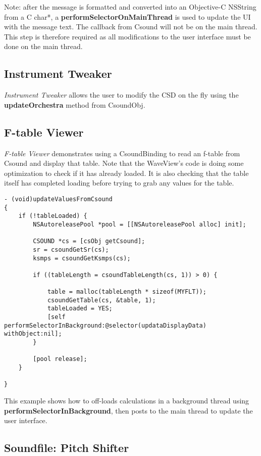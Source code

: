 \documentclass[11pt]{article}
\begin{document}
Note: after the message is formatted and converted into an Objective-C NSString from a C char*, a \textbf{performSelectorOnMainThread} is used to update the UI with the message text.  The callback from Csound will not be on the main thread. This step is therefore required as all modifications to the user interface must be done on the main thread.

\subsection{Instrument Tweaker}

\emph{Instrument Tweaker} allows the user to modify the CSD on the fly using the \textbf{updateOrchestra} method from CsoundObj. 

\subsection{F-table Viewer}

\emph{F-table Viewer} demonstrates using a CsoundBinding to read an f-table from Csound and display that table.  Note that the WaveView's code is doing some optimization to check if it has already loaded.  It is also checking that the table itself has completed loading before trying to grab any values for the table.

\begin{lstlisting}[caption=Waveview code demonstrating reading f-tables from Csound]
- (void)updateValuesFromCsound
{
    if (!tableLoaded) {
        NSAutoreleasePool *pool = [[NSAutoreleasePool alloc] init];

        CSOUND *cs = [csObj getCsound];
        sr = csoundGetSr(cs);
        ksmps = csoundGetKsmps(cs);

        if ((tableLength = csoundTableLength(cs, 1)) > 0) {

            table = malloc(tableLength * sizeof(MYFLT));
            csoundGetTable(cs, &table, 1);
            tableLoaded = YES;
            [self performSelectorInBackground:@selector(updataDisplayData) withObject:nil];
        }

        [pool release];
    }

}
\end{lstlisting}

This example shows how to off-loads calculations in a background thread using \textbf{performSelectorInBackground}, then posts to the main thread to update the user interface.

\subsection{Soundfile: Pitch Shifter}
\end{document}
